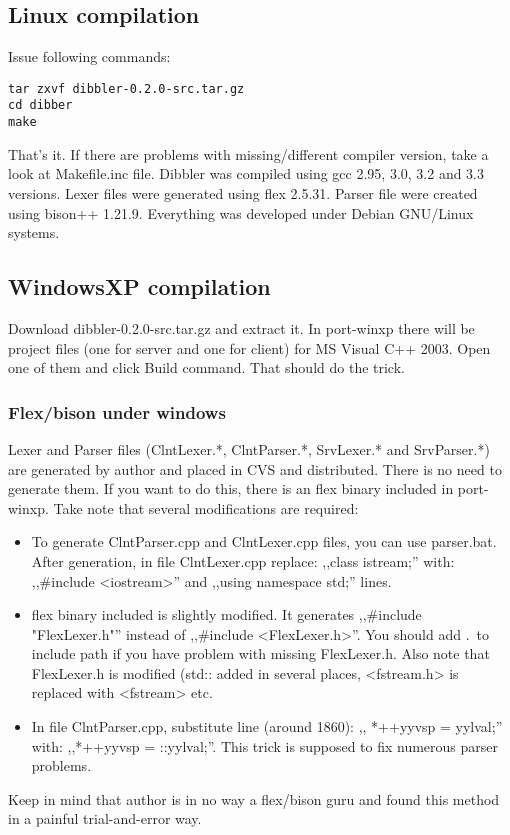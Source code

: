 \subsection{Linux compilation}
Issue following commands:
\begin{verbatim}
tar zxvf dibbler-0.2.0-src.tar.gz
cd dibber
make
\end{verbatim}
That's it. If there are problems with missing/different compiler
version, take a look at Makefile.inc file. Dibbler was compiled using
gcc 2.95, 3.0, 3.2 and 3.3 versions. Lexer files were generated using
flex 2.5.31. Parser file were created using bison++ 1.21.9. Everything
was developed under Debian GNU/Linux systems.

\subsection{WindowsXP compilation}
Download dibbler-0.2.0-src.tar.gz and extract it. In port-winxp there
will be project files (one for server and one for client) for MS
Visual C++ 2003. Open one of them and click Build command. That should
do the trick.

\subsubsection{Flex/bison under windows}

Lexer and Parser files (ClntLexer.*, ClntParser.*, SrvLexer.* and
SrvParser.*) are generated by author and placed in CVS and
distributed. There is no need to generate them. If you want to do
this, there is an flex binary included in port-winxp. Take note that
several modifications are required:

\begin{itemize}
\item To generate ClntParser.cpp and ClntLexer.cpp files, you can use
parser.bat. After generation, in file ClntLexer.cpp replace: ,,class istream;''
with: ,,\#include <iostream>'' and ,,using namespace std;'' lines.
\item flex binary included is slightly modified. It generates
,,\#include "FlexLexer.h"'' instead of ,,\#include <FlexLexer.h>''. You should
add .\ to include path if you have problem with missing FlexLexer.h.
Also note that FlexLexer.h is modified (std:: added in several places,
<fstream.h> is replaced with <fstream> etc.
\item In file ClntParser.cpp, substitute line (around 1860): ,,	*++yyvsp = yylval;''
with: ,,*++yyvsp = ::yylval;''. This trick is supposed to fix numerous
parser problems.
\end{itemize}

Keep in mind that author is in no way a flex/bison guru and found this method
in a painful trial-and-error way. 
